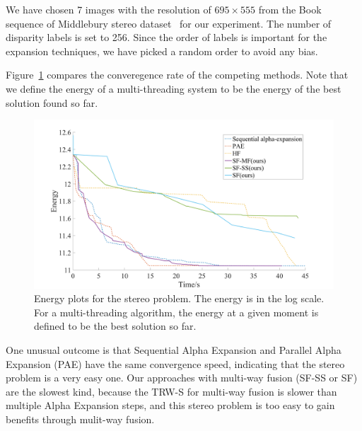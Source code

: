 
\noindent We have chosen 7 images with the resolution of $695\times555$
from the Book sequence of Middlebury stereo dataset~\cite{middlebury_stereo} for our
experiment. The number of disparity labels is
set to 256.
%
Since the order of labels is important for the expansion techniques,
we have picked a random order to avoid any bias.
%



Figure~\ref{fig:stereo_global} compares the converegence rate of the
competing methods. Note that we define the energy of a multi-threading
system to be the energy of the best solution found so far.
%
\begin{figure}[tb]
  \includegraphics[width=\columnwidth]{figure/stereo_global.png}
 \caption{Energy plots for the stereo problem. The energy is in the log
 scale. For a multi-threading algorithm, the energy at a given moment is
 defined to be the best solution so far.} \label{fig:stereo_global}
\end{figure}
%
One unusual outcome is that Sequential Alpha Expansion and Parallel
Alpha Expansion (PAE) have the same convergence speed, indicating that
the stereo problem is a very easy one.
Our approaches with multi-way fusion (SF-SS or SF) are the slowest kind,
because the TRW-S for multi-way fusion is slower than multiple Alpha
Expansion steps, and this stereo problem is too easy to gain benefits
through mulit-way fusion.
%
